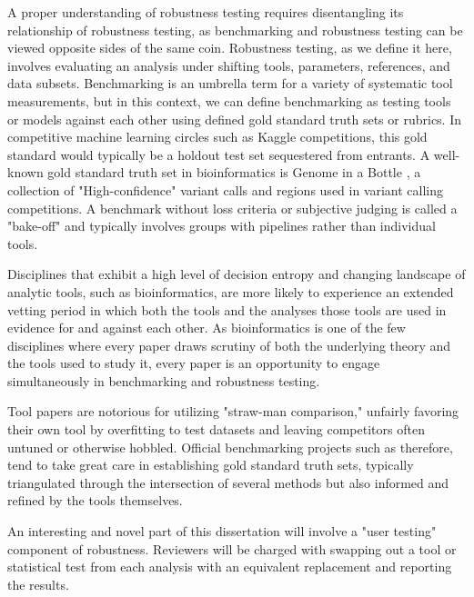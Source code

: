 \documentclass{drexelthesis}
\begin{document}
A proper understanding of robustness testing requires disentangling its relationship of robustness testing, as benchmarking and robustness testing can be viewed opposite sides of the same coin. Robustness testing, as we define it here, involves evaluating an analysis under shifting tools, parameters, references, and data subsets. Benchmarking is an umbrella term for a variety of systematic tool measurements, but in this context, we can define benchmarking as testing tools or models against each other using defined gold standard truth sets or rubrics. In competitive machine learning circles such as Kaggle competitions, this gold standard would typically be a holdout test set sequestered from entrants. A well-known gold standard truth set in bioinformatics is Genome in a Bottle \cite{Zook2014-wy}, a collection of "High-confidence" variant calls and regions used in variant calling competitions. A benchmark without loss criteria or subjective judging is called a "bake-off" and typically involves groups with pipelines rather than individual tools. 

Disciplines that exhibit a high level of decision entropy and changing landscape of analytic tools, such as bioinformatics, are more likely to experience an extended vetting period in which both the tools and the analyses those tools are used in evidence for and against each other. As bioinformatics is one of the few disciplines where every paper draws scrutiny of both the underlying theory and the tools used to study it, every paper is an opportunity to engage simultaneously in benchmarking and robustness testing.

Tool papers are notorious for utilizing "straw-man comparison," unfairly favoring their own tool by overfitting to test datasets and leaving competitors often untuned or otherwise hobbled. Official benchmarking projects such as therefore, tend to take great care in establishing gold standard truth sets, typically triangulated through the intersection of several methods but also informed and refined by the tools themselves.

An interesting and novel part of this dissertation will involve a "user testing" component of robustness. Reviewers will be charged with swapping out a tool or statistical test from each analysis with an equivalent replacement and reporting the results.
\end{document}

